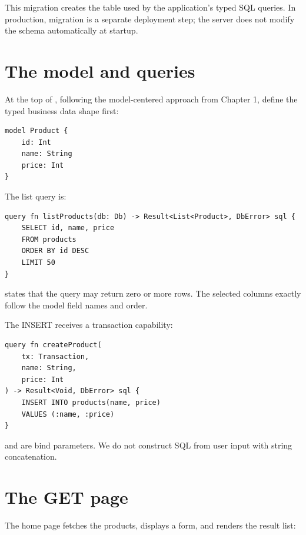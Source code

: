 This migration creates the table used by the application's typed SQL queries. In production, migration is a separate deployment step; the server does not modify the schema automatically at startup.

\section{The model and queries}

At the top of , following the model-centered approach from Chapter 1, define the typed business data shape first:

\begin{lstlisting}[language=RWLang]
model Product {
    id: Int
    name: String
    price: Int
}
\end{lstlisting}

The list query is:

\begin{lstlisting}[language=RWLang]
query fn listProducts(db: Db) -> Result<List<Product>, DbError> sql {
    SELECT id, name, price
    FROM products
    ORDER BY id DESC
    LIMIT 50
}
\end{lstlisting}

 states that the query may return zero or more  rows. The selected columns exactly follow the model field names and order.

The INSERT receives a transaction capability:

\begin{lstlisting}[language=RWLang]
query fn createProduct(
    tx: Transaction,
    name: String,
    price: Int
) -> Result<Void, DbError> sql {
    INSERT INTO products(name, price)
    VALUES (:name, :price)
}
\end{lstlisting}

 and  are bind parameters. We do not construct SQL from user input with string concatenation.

\section{The GET page}

The home page fetches the products, displays a form, and renders the result list:

